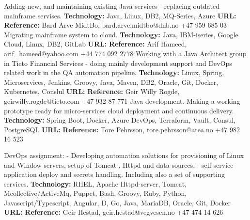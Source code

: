 \documentclass[11pt,a4paper,sans]{moderncv} %
\begin{document}
{
Adding new, and maintaining existing Java services - replacing outdated mainframe servises.
\newline{}\textbf{Technology:}
Java, Linux, DB2, MQ-Series, Azure
\newline{}\textbf{URL:} 
\newline{}\textbf{Reference:} Bard Arve MidtBo, bard.arve.midtbo@dnb.no +47 959 685 03
}
{
Migrating mainframe system to cloud.
\newline{}\textbf{Technology:}
Java, IBM-iseries, Google Cloud, Linux, DB2, GitLab
\newline{}\textbf{URL:} \httplink{}
\newline{}\textbf{Reference:} Arif Hameed, arif\_hameed@yahoo.com +44 774 092 2778
}
{
Working with a Java Architect group in Tieto Financial Services - doing mainly development support and DevOps related work in the QA automation pipeline.
\newline{}\textbf{Technology:}
Linux, Spring, Microservices, Jenkins, Groovy, Java, Maven, DB2, Oracle, Git, Docker, Kubernetes, Conslul
\newline{}\textbf{URL:} 
\newline{}\textbf{Reference:} Geir Willy Rogde, geirwilly.rogde@tieto.com +47 932 87 771
}
{
Java development. Making a working prototype ready for micro-services cloud deployment and continuous delivery.
\newline{}\textbf{Technology:}
Spring Boot, Docker, Azure DevOps, Terraform, Vault, Consul, PostgreSQL
\newline{}\textbf{URL:} 
\newline{}\textbf{Reference:} Tore Pehrsson, tore.pehrsson@atea.no +47 982 16 523
}

{
DevOps assignment: - Developing automation solutions for provisioning of Linux and Window servers, setup of Tomcat-, Httpd and data-sources, - self-service application deploy and secrets handling. Including also a set of supporting services.
\newline{}\textbf{Technology:}
RHEL, Apache Httpd-server, Tomcat, Mcollective/ActiveMq, Puppet, Bash, Groovy, Ruby, Python, Javascript/Typescript, Angular, D, Go, Java, MariaDB, Oracle, Git, Docker
\newline{}\textbf{URL:} 
\newline{}\textbf{Reference:} Geir Hestad, geir.hestad@vegvesen.no +47 474 14 626
}
\end{document}
